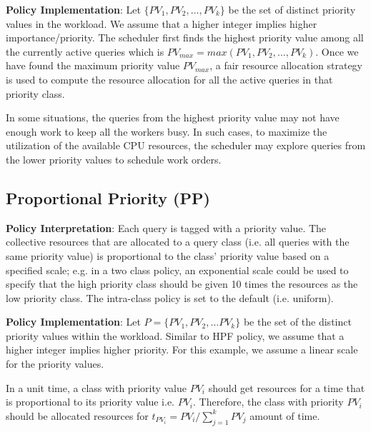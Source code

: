\textbf{Policy Implementation}: 
Let $\{PV_{1}, PV_{2}, \ldots, PV_{k}\}$ be the set of distinct priority values in the 
workload. 
We assume that a higher integer implies higher importance/priority.
The scheduler first finds the highest priority value among all the currently active queries 
which is $PV_{max} = max(PV_{1}, PV_{2}, \ldots, PV_{k})$. 
Once we have found the maximum priority value $PV_{max}$, a fair resource allocation 
strategy is used to compute the resource allocation for all the active queries in that 
priority class. 


In some situations, the queries from the highest priority value may not have enough work to keep all the workers busy. 
In such cases, to maximize the utilization of the available CPU resources, the 
scheduler may explore queries from the lower priority values to schedule work orders.

\subsection{Proportional Priority (PP)}\label{ssec:proportional-priority}
\textbf{Policy Interpretation}: Each query is tagged with a priority value.
The collective resources that are allocated to a query class (i.e. all queries with the same priority value) is proportional to the class' priority value based on a specified scale; e.g. in a two class policy, an exponential scale could be used to specify that the high priority class should be given 10 times the resources as the low priority class. 
The intra-class policy is set to the default (i.e. uniform).

\textbf{Policy Implementation}: 
Let $P = \{PV_{1}, PV_{2}, \ldots PV_{k}\}$ be the set of the distinct priority values 
within the workload. 
Similar to HPF policy, we assume that a higher integer implies higher 
priority.
For this example, we assume a linear scale for the priority values.

In a unit time, a class with priority value $PV_{i}$ should get resources for a time that is 
proportional to its priority value i.e. $PV_{i}$. 
Therefore, the class with priority $PV_{i}$ should be allocated resources for 
$t_{PV_{i}} = PV_{i}/\sum\limits_{j = 1}^{k}PV_{j}$ amount of time. 

